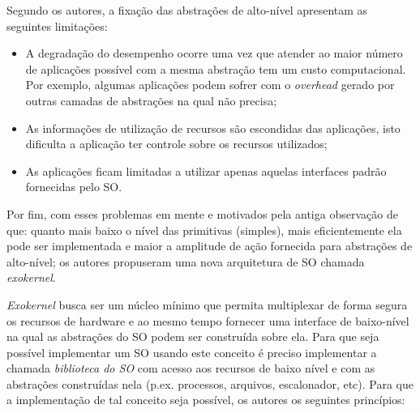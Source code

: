 Segundo os autores, a fixação das abstrações de alto-nível apresentam as
seguintes limitações:

\begin{itemize}
  \item A degradação do desempenho ocorre uma vez que atender ao maior número
        de aplicações possível com a mesma abstração tem um custo
        computacional. Por exemplo, algumas aplicações podem sofrer com o
        \emph{overhead} gerado por outras camadas de abstrações na qual não
        precisa;
  \item As informações de utilização de recursos são escondidas das aplicações,
        isto dificulta a aplicação ter controle sobre os recursos utilizados;
  \item As aplicações ficam limitadas a utilizar apenas aquelas interfaces
        padrão fornecidas pelo SO.
\end{itemize}

Por fim, com esses problemas em mente e motivados pela antiga observação de que:
quanto mais baixo o nível das primitivas (simples), mais eficientemente ela
pode ser implementada e maior a amplitude de ação fornecida para abstrações de
alto-nível; os autores propuseram uma nova arquitetura de SO chamada
\emph{exokernel}.

\emph{Exokernel} busca ser um núcleo mínimo que permita multiplexar de forma
segura os recursos de hardware e ao mesmo tempo fornecer uma interface de
baixo-nível na qual as abstrações do SO podem ser construída sobre ela. Para
que seja possível implementar um SO usando este conceito é preciso implementar
a chamada \textit{biblioteca do SO} com acesso aos recursos de baixo nível e
com as abstrações construídas nela (p.ex. processos, arquivos, escalonador,
etc). Para que a implementação de tal conceito seja possível, os autores os
seguintes princípios:

